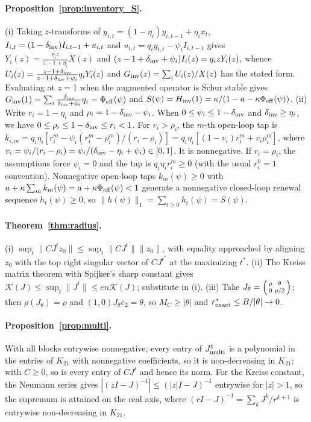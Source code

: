 \paragraph{Proposition~\ref{prop:inventory_S}.} (i) Taking $z$-transforms of $y_{i,t}=(1-\eta_i)y_{i,t-1}+\eta_i x_t$, $I_{i,t}=(1-\delta_{\rm inv})I_{i,t-1}+u_{i,t}$ and $u_{i,t}=q_i y_{i,t}-\psi_i I_{i,t-1}$ gives $Y_i(z)=\frac{\eta_i z}{z-1+\eta_i}X(z)$ and $(z-1+\delta_{\rm inv}+\psi_i)I_i(z)=q_i z Y_i(z)$, whence $U_i(z)=\frac{z-1+\delta_{\rm inv}}{z-1+\delta_{\rm inv}+\psi_i}q_i Y_i(z)$ and $G_{\rm inv}(z)=\sum_i U_i(z)/X(z)$ has the stated form. Evaluating at $z=1$ when the augmented operator is Schur stable gives $G_{\rm inv}(1)=\sum_i \frac{\delta_{\rm inv}}{\delta_{\rm inv}+\psi_i}q_i=\Phi_{\rm eff}(\psi)$ and $S(\psi)=H_{\rm inv}(1)=\kappa/(1-a-\kappa\Phi_{\rm eff}(\psi))$. (ii) Write $r_i=1-\eta_i$ and $\rho_i=1-\delta_{\rm inv}-\psi_i$. When $0\le\psi_i\le 1-\delta_{\rm inv}$ and $\delta_{\rm inv}\ge\eta_i$, we have $0\le\rho_i\le 1-\delta_{\rm inv}\le r_i<1$. For $r_i>\rho_i$, the $m$-th open-loop tap is
$k_{i,m}=q_i\eta_i[r_i^m-\psi_i(r_i^m-\rho_i^m)/(r_i-\rho_i)]
=q_i\eta_i[(1-v_i)r_i^m+v_i\rho_i^m]$, where
$v_i=\psi_i/(r_i-\rho_i)=\psi_i/(\delta_{\rm inv}-\eta_i+\psi_i)\in[0,1]$.
It is nonnegative. If $r_i=\rho_i$, the assumptions force $\psi_i=0$ and the tap is $q_i\eta_i r_i^m\ge0$ (with the usual $r_i^0=1$ convention).
Nonnegative open-loop taps $k_m(\psi)\ge0$ with $a+\kappa\sum_m k_m(\psi)=a+\kappa\Phi_{\rm eff}(\psi)<1$ generate a nonnegative closed-loop renewal sequence $h_t(\psi)\ge0$, so $\|h(\psi)\|_1=\sum_{t\ge0}h_t(\psi)=S(\psi)$.

\paragraph{Theorem~\ref{thm:radius}.} (i) $\sup_t\|CJ^tz_0\|\le\sup_t\|CJ^t\|\|z_0\|$, with equality approached by aligning $z_0$ with the top right singular vector of $CJ^{t^*}$ at the maximizing $t^*$. (ii) The Kreiss matrix theorem with Spijker's sharp constant gives $\mathcal K(J)\le\sup_t\|J^t\|\le en\mathcal K(J)$; substitute in (i). (iii) Take $J_\theta=\begin{psmallmatrix}\rho&\theta\\0&\rho/2\end{psmallmatrix}$; then $\rho(J_\theta)=\rho$ and $(1,0)J_\theta e_2=\theta$, so $M_C\ge|\theta|$ and $r^*_{\rm exact}\le B/|\theta|\to0$.

\paragraph{Proposition~\ref{prop:multi}.} With all blocks entrywise nonnegative, every entry of $J_{\rm multi}^t$ is a polynomial in the entries of $K_{21}$ with nonnegative coefficients, so it is non-decreasing in $K_{21}$; with $C\ge0$, so is every entry of $CJ^t$ and hence its norm. For the Kreiss constant, the Neumann series gives $|(zI-J)^{-1}|\le(|z|I-J)^{-1}$ entrywise for $|z|>1$, so the supremum is attained on the real axis, where $(rI-J)^{-1}=\sum_kJ^k/r^{k+1}$ is entrywise non-decreasing in $K_{21}$.

